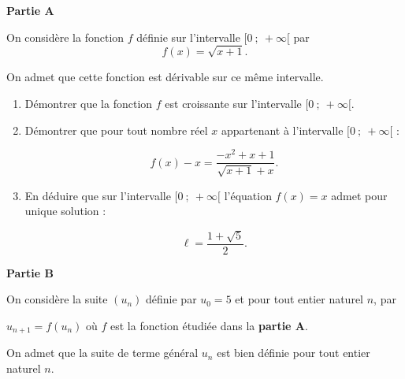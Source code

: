\medskip

\textbf{Partie A}

\medskip

On considère la fonction $f$ définie sur l'intervalle $[0~;~+\infty[$ par 
\[f(x) = \sqrt{x + 1}.\]

On admet que cette fonction est dérivable sur ce même intervalle.

\medskip

\begin{enumerate}
\item Démontrer que la fonction $f$ est croissante sur l'intervalle $[0~;~+\infty[$.
\item Démontrer que pour tout nombre réel $x$ appartenant à l'intervalle $[0~;~+\infty[$ :

\[f(x) - x = \dfrac{-x^2 + x + 1}{\sqrt{x + 1} + x}.\]

\item En déduire que sur l'intervalle $[0~;~+\infty[$ l'équation $f(x) = x$ admet pour unique solution :

\[\ell = \dfrac{1 +\sqrt 5}{2}.\]

\end{enumerate}

\medskip

\textbf{Partie B}

\medskip

On considère la suite $\left(u_n\right)$ définie par $u_0 = 5$ et pour tout entier naturel $n$, par 

$u_{n+1} = f\left(u_n\right)$ où $f$ est la fonction étudiée dans la \textbf{partie A}.

On admet que la suite de terme général $u_n$ est bien définie pour tout entier naturel $n$.

\medskip

